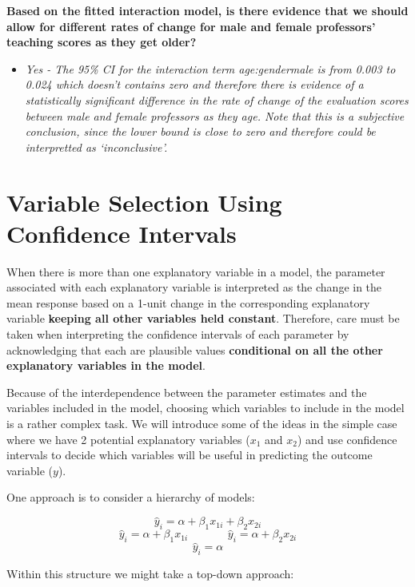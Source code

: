 \documentclass[]{article}
\providecommand{\tightlist}{%
  \setlength{\itemsep}{0pt}\setlength{\parskip}{0pt}}
\begin{document}
\textbf{Based on the fitted interaction model, is there evidence that we
should allow for different rates of change for male and female
professors' teaching scores as they get older?}

\begin{itemize}
\tightlist
\item
  \emph{Yes - The 95\% CI for the interaction term age:gendermale is
  from 0.003 to 0.024 which doesn't contains zero and therefore there is
  evidence of a statistically significant difference in the rate of
  change of the evaluation scores between male and female professors as
  they age. Note that this is a subjective conclusion, since the lower
  bound is close to zero and therefore could be interpretted as
  `inconclusive'.}
\end{itemize}

\newpage

\section{Variable Selection Using Confidence Intervals}\label{sec:CIs}

When there is more than one explanatory variable in a model, the
parameter associated with each explanatory variable is interpreted as
the change in the mean response based on a 1-unit change in the
corresponding explanatory variable \textbf{keeping all other variables
held constant}. Therefore, care must be taken when interpreting the
confidence intervals of each parameter by acknowledging that each are
plausible values \textbf{conditional on all the other explanatory
variables in the model}.

Because of the interdependence between the parameter estimates and the
variables included in the model, choosing which variables to include in
the model is a rather complex task. We will introduce some of the ideas
in the simple case where we have 2 potential explanatory variables
(\(x_1\) and \(x_2\)) and use confidence intervals to decide which
variables will be useful in predicting the outcome variable (\(y\)).

One approach is to consider a hierarchy of models:

\[\hat{y}_i = \alpha + \beta_1 x_{1i} + \beta_2 x_{2i}\]
\[\hat{y}_i = \alpha + \beta_1 x_{1i} ~~~~~~~~~~~~~~~~ \hat{y}_i = \alpha + \beta_2 x_{2i}\]
\[\hat{y}_i = \alpha\]

Within this structure we might take a top-down approach:
\end{document}
